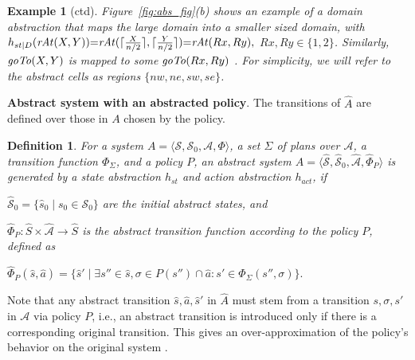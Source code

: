 \documentclass{new_tlp}
\newcommand{\sys}{\ensuremath{A}}
\newcommand{\absys}{\ensuremath{\widehat{A}}}
\newcommand{\nqbls}{\vspace*{-0.25\baselineskip}}
\newcommand{\nhbls}{\vspace*{-0.5\baselineskip}}
\newcommand{\leanparagraph}[1]{\smallskip\noindent\textbf{#1}. }
\def\mi#1{\mathit{#1\/}}
\def\beq{\begin{equation}}
\newtheorem{defn}{Definition}
\newtheorem{exmp}{Example}
\begin{document}
\begin{exmp}[ctd]\label{ex:regions}
Figure~\ref{fig:abs_fig}(b) shows an example of a domain abstraction that maps the large domain into a smaller sized domain, with $h_{st|D}(\mi{rAt}(X,Y)){=}\mi{rAt}(\lceil \frac{X}{n/2}\rceil,\lceil\frac{Y}{n/2}\rceil){=}\mi{rAt}(Rx,Ry),$ $Rx,Ry {\in} \{1,2\}$. Similarly, $\mi{goTo}(X,Y)$ is mapped to some $\mi{goTo}(Rx,Ry)$%
. For simplicity, we will refer to the abstract cells as regions $\{nw,ne,sw,se\}$.
\end{exmp}
\nhbls

\leanparagraph{Abstract system with an abstracted policy}
The transitions of
$\absys$ are defined over those 
in $\sys$ 
chosen by the policy.

\begin{defn}
For a system
$\sys=\langle \mathcal{S},\mathcal{S}_0,\mathcal{A},\Phi\rangle$, a set
$\Sigma$ of plans 
over $\mathcal{A}$, a transition function
$\Phi_\Sigma$, and a policy $P$, an abstract system $\widehat{A}=\langle \hat{\mathcal{S}}, \hat{\mathcal{S}}_0, \hat{\mathcal{A}}, \widehat{\Phi}_P \rangle$
is \emph{generated} by a state abstraction $h_{st}$ and 
action abstraction $h_{act}$, if 

\vspace{1pt}

\begin{compactitem}[--]
\item $\hat{\mathcal{S}}_0 = \{\hat{s}_0 \mid s_0 \in \mathcal{S}_0\}$ are the initial abstract states, and 
\item $\widehat{\Phi}_{P}: \widehat{S} \times  \hat{\mathcal{A}} \rightarrow \widehat{S}$ is the abstract transition function according to the policy $P$, defined as
\smallskip

\centerline{$
\widehat{\Phi}_{P}(\hat{s},\hat{a}) {=} 
\{
\hat{s}' \mid  \exists s'' \in
\hat{s}, \sigma \in P(s'')\cap \hat{a}:
s' \in \Phi_\Sigma(s'',\sigma)\}.
$}
\nqbls
\end{compactitem}
\end{defn}
Note that any abstract transition $\hat{s},\hat{a},\hat{s}'$
in $\widehat{A}$
must 
stem from a transition $s,\sigma,s'$ in $\mathcal{A}$
via policy $P$,
i.e., an abstract transition is introduced only if there is a corresponding original transition. This gives an over-approximation of the policy's behavior on the original system \cite{clarke03}.
\end{document}
